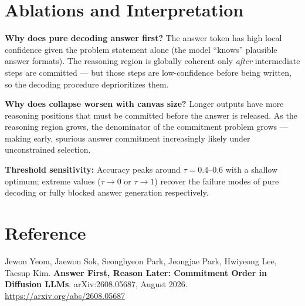 \documentclass[10pt,twocolumn]{article}
\begin{document}
\section{Ablations and Interpretation}

\textbf{Why does pure decoding answer first?}
The answer token has high local confidence given the problem statement alone
(the model ``knows'' plausible answer formats). The reasoning region is globally
coherent only \emph{after} intermediate steps are committed — but those steps are
low-confidence before being written, so the decoding procedure deprioritizes them.

\textbf{Why does collapse worsen with canvas size?}
Longer outputs have more reasoning positions that must be committed before the
answer is released. As the reasoning region grows, the denominator of the
commitment problem grows — making early, spurious answer commitment
increasingly likely under unconstrained selection.

\textbf{Threshold sensitivity:} Accuracy peaks around $\tau = 0.4$--$0.6$ with
a shallow optimum; extreme values ($\tau \to 0$ or $\tau \to 1$) recover the
failure modes of pure decoding or fully blocked answer generation respectively.

\section*{Reference}

Jewon Yeom, Jaewon Sok, Seonghyeon Park, Jeongjae Park, Hwiyeong Lee, Taesup Kim.
\textbf{Answer First, Reason Later: Commitment Order in Diffusion LLMs}.
arXiv:2608.05687, August 2026.
\url{https://arxiv.org/abs/2608.05687}
\end{document}
